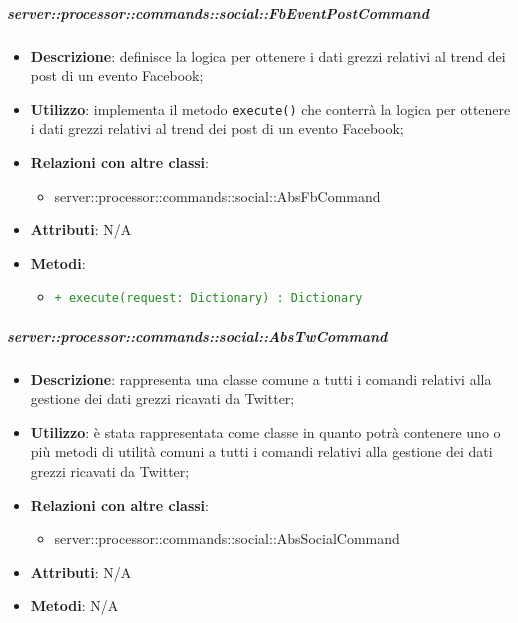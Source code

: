         \subparagraph{server::processor::commands::social::FbEventPostCommand} %
        \label{subp:bdsm_app_server_processor_commands_social_fbeventpostcommand}
        \begin{itemize}
          \item \textbf{Descrizione}: definisce la logica per ottenere i dati grezzi relativi al trend dei post di un evento Facebook;
          \item \textbf{Utilizzo}: implementa il metodo \texttt{execute()} che conterrà la logica per ottenere i dati grezzi relativi al trend dei post di un evento Facebook;
          \item \textbf{Relazioni con altre classi}:
            \begin{itemize}
              \item server::processor::commands::social::AbsFbCommand
            \end{itemize}
            \item \textbf{Attributi}: N/A
            \item \textbf{Metodi}:
            \begin{itemize}
                \item \textcolor{forestgreen}{\texttt{+ execute(request: Dictionary) : Dictionary}}
            \end{itemize}
        \end{itemize}


        \subparagraph{server::processor::commands::social::AbsTwCommand} %
        \label{subp:bdsm_app_server_processor_commands_social::abstwcommand}
        \begin{itemize}
          \item \textbf{Descrizione}: rappresenta una classe comune a tutti i comandi relativi alla gestione dei dati grezzi ricavati da Twitter;
          \item \textbf{Utilizzo}: è stata rappresentata come classe in quanto potrà contenere uno o più metodi di utilità comuni a tutti i comandi relativi alla gestione dei dati grezzi ricavati da Twitter;
          \item \textbf{Relazioni con altre classi}:
            \begin{itemize}
              \item server::processor::commands::social::AbsSocialCommand
            \end{itemize}
          \item \textbf{Attributi}: N/A
          \item \textbf{Metodi}: N/A
        \end{itemize}

